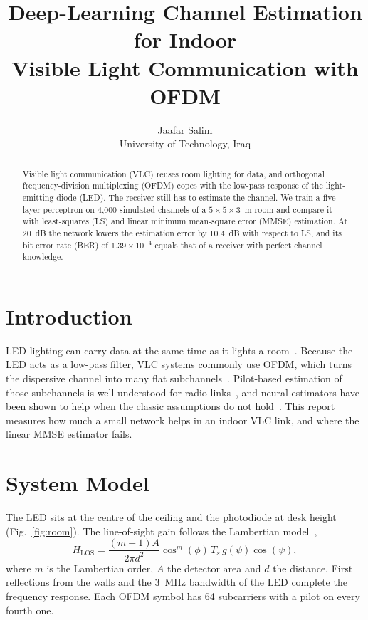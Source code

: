 \documentclass[10pt,twocolumn]{article}
\title{Deep-Learning Channel Estimation for Indoor\\Visible Light Communication with OFDM}
\author{Jaafar Salim\\University of Technology, Iraq}
\date{}
\begin{document}
\maketitle

\begin{abstract}
Visible light communication (VLC) reuses room lighting for data, and orthogonal frequency-division
multiplexing (OFDM) copes with the low-pass response of the light-emitting diode (LED). The receiver still
has to estimate the channel. We train a five-layer perceptron on 4,000 simulated channels of a
$5\times5\times3$~m room and compare it with least-squares (LS) and linear minimum mean-square error (MMSE)
estimation. At 20~dB the network lowers the estimation error by 10.4~dB with respect to LS, and its bit error
rate (BER) of $1.39\times10^{-4}$ equals that of a receiver with perfect channel knowledge.
\end{abstract}

\section{Introduction}
LED lighting can carry data at the same time as it lights a room~\cite{komine2004fundamental,elgala2011indoor}.
Because the LED acts as a low-pass filter, VLC systems commonly use OFDM, which turns the dispersive channel into
many flat subchannels~\cite{armstrong2009ofdm}. Pilot-based estimation of those subchannels is well understood
for radio links~\cite{coleri2002channel}, and neural estimators have been shown to help when the classic
assumptions do not hold~\cite{ye2018power,soltani2019deep}. This report measures how much a small network
helps in an indoor VLC link, and where the linear MMSE estimator fails.

\section{System Model}
The LED sits at the centre of the ceiling and the photodiode at desk height (Fig.~\ref{fig:room}). The
line-of-sight gain follows the Lambertian model~\cite{kahn1997wireless},
\begin{equation}
H_{\mathrm{LOS}} = \frac{(m+1)A}{2\pi d^2}\cos^m(\phi)\,T_s\,g(\psi)\cos(\psi),
\label{eq:los}
\end{equation}
where $m$ is the Lambertian order, $A$ the detector area and $d$ the distance. First reflections from the walls
and the 3~MHz bandwidth of the LED complete the frequency response. Each OFDM symbol has 64 subcarriers with a
pilot on every fourth one.
\end{document}
